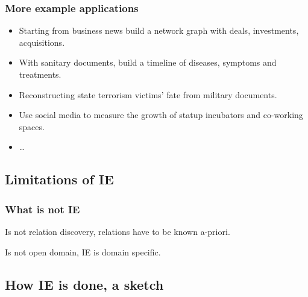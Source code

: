 \documentclass{beamer}
\begin{document}
\begin{frame}
\frametitle{More example applications}

\begin{itemize}
 \item Starting from business news build a network graph with deals, investments, acquisitions.
 \item With sanitary documents, build a timeline of diseases, symptoms and treatments.
 \item Reconstructing state terrorism victims' fate from military documents.
 \item Use social media to measure the growth of statup incubators and co-working spaces.
 \item \dots
\end{itemize}

\end{frame}

\subsection{Limitations of IE}


\begin{frame}
\frametitle{What is not IE}

\pause

\vfill
\begin{block}{ }
\centerline{Is not relation discovery, relations have to be known a-priori.}
\end{block}
\pause
\vfill
\begin{block}{ }
\centerline{Is not open domain, IE is domain specific.}
\end{block}
\vfill

\end{frame}


\subsection{How IE is done, a sketch}


\end{document}
